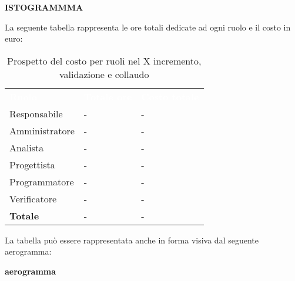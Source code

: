 \textbf{ISTOGRAMMMA}


La seguente tabella rappresenta le ore totali dedicate ad ogni ruolo e il costo in euro:

\begin{table}[!htbp]
\begin{center}
\renewcommand{\arraystretch}{1.5}
\begin{tabular}{ m{}<{\centering}  m{}<{\centering} m{}<{\centering}}
	\rowcolor{darkblue}
	\textcolor{white}{\textbf{Ruolo}}&\textcolor{white}{\textbf{Totale ore}}&\textcolor{white}{\textbf{Costo totale}}\\ 

	Responsabile  & - & - \\	

	Amministratore & - & - \\
	
	Analista & - & - \\
	
	Progettista & - & - \\
	
	Programmatore & - & - \\
	
	Verificatore & - & - \\
	
	\textbf{Totale} & - & - \\
	
\end{tabular}
\caption{Prospetto del costo per ruoli nel X incremento,  validazione e collaudo}
\end{center}
\end{table}

La tabella può essere rappresentata anche in forma visiva dal seguente aerogramma:

\textbf{aerogramma}

